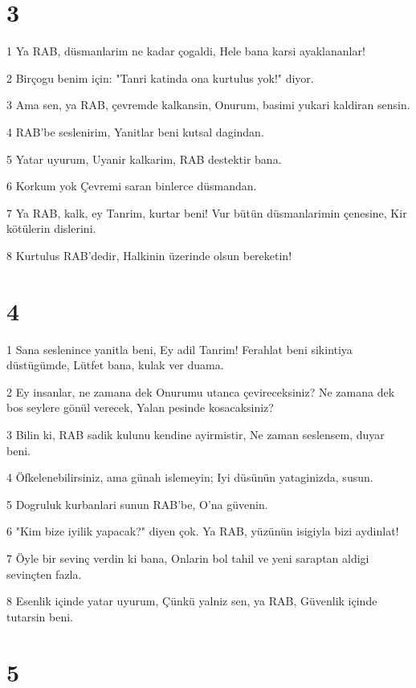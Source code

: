\chapter{3}

\par 1 Ya RAB, düsmanlarim ne kadar çogaldi, Hele bana karsi ayaklananlar!
\par 2 Birçogu benim için: "Tanri katinda ona kurtulus yok!" diyor.
\par 3 Ama sen, ya RAB, çevremde kalkansin, Onurum, basimi yukari kaldiran sensin.
\par 4 RAB'be seslenirim, Yanitlar beni kutsal dagindan.
\par 5 Yatar uyurum, Uyanir kalkarim, RAB destektir bana.
\par 6 Korkum yok Çevremi saran binlerce düsmandan.
\par 7 Ya RAB, kalk, ey Tanrim, kurtar beni! Vur bütün düsmanlarimin çenesine, Kir kötülerin dislerini.
\par 8 Kurtulus RAB'dedir, Halkinin üzerinde olsun bereketin!

\chapter{4}

\par 1 Sana seslenince yanitla beni, Ey adil Tanrim! Ferahlat beni sikintiya düstügümde, Lütfet bana, kulak ver duama.
\par 2 Ey insanlar, ne zamana dek Onurumu utanca çevireceksiniz? Ne zamana dek bos seylere gönül verecek, Yalan pesinde kosacaksiniz?
\par 3 Bilin ki, RAB sadik kulunu kendine ayirmistir, Ne zaman seslensem, duyar beni.
\par 4 Öfkelenebilirsiniz, ama günah islemeyin; Iyi düsünün yataginizda, susun.
\par 5 Dogruluk kurbanlari sunun RAB'be, O'na güvenin.
\par 6 "Kim bize iyilik yapacak?" diyen çok. Ya RAB, yüzünün isigiyla bizi aydinlat!
\par 7 Öyle bir sevinç verdin ki bana, Onlarin bol tahil ve yeni saraptan aldigi sevinçten fazla.
\par 8 Esenlik içinde yatar uyurum, Çünkü yalniz sen, ya RAB, Güvenlik içinde tutarsin beni.

\chapter{5}

